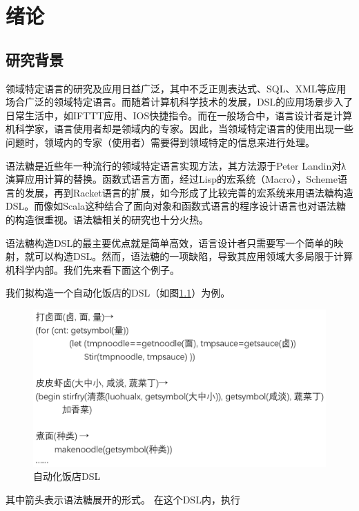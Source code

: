 \pagestyle{fancy}
\normalsize
\linespread{1.5}\selectfont
\chapter{绪论}

\section{研究背景}
领域特定语言\cite{dsl}的研究及应用日益广泛，其中不乏正则表达式\cite{regexp}、SQL\cite{sql}、XML\cite{xml}等应用场合广泛的领域特定语言。而随着计算机科学技术的发展，DSL的应用场景步入了日常生活中，如IFTTT应用、IOS快捷指令。而在一般场合中，语言设计者是计算机科学家，语言使用者却是领域内的专家。因此，当领域特定语言的使用出现一些问题时，领域内的专家（使用者）需要得到领域特定的信息来进行处理。

语法糖是近些年一种流行的领域特定语言实现方法，其方法源于Peter Landin对λ演算应用计算的替换\cite{landin}。函数式语言方面，经过Lisp的宏系统（Macro），Scheme语言的发展，再到Racket\cite{racket}语言的扩展\cite{frommacro}，如今形成了比较完善的宏系统来用语法糖构造DSL。而像如Scala\cite{scala}这种结合了面向对象和函数式语言的程序设计语言也对语法糖的构造很重视。语法糖相关的研究\cite{sugarj}也十分火热。

语法糖构造DSL的最主要优点就是简单高效，语言设计者只需要写一个简单的映射，就可以构造DSL。然而，语法糖的一项缺陷，导致其应用领域大多局限于计算机科学内部。我们先来看下面这个例子。

	我们拟构造一个自动化饭店的DSL（如图\ref{fig:restaurant}）为例。
	
	\begin{figure}[H]
		\centering
		\includegraphics[width=12cm]{images/chapter1/restaurant.png}
		\caption{自动化饭店DSL}
		\label{fig:restaurant}
	\end{figure}
其中箭头表示语法糖展开的形式。
在这个DSL内，执行

